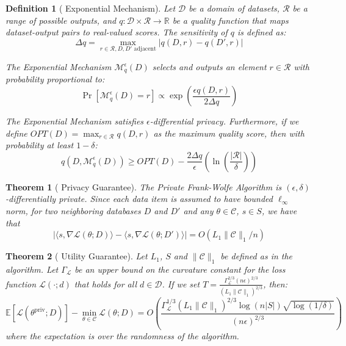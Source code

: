 \documentclass[12pt,letterpaper]{article}
\newtheorem{theorem}{Theorem}[section]
\newtheorem{definition}{Definition}
\begin{document}
\begin{definition}[\cite{ExpMech} Exponential Mechanism]
    \label{def:ExpMech}
    Let $\mathcal{D}$ be a domain of datasets, $\mathcal{R}$ be a range of possible outputs, and $q: \mathcal{D} \times \mathcal{R} \rightarrow \mathbb{R}$ be a quality function that maps dataset-output pairs to real-valued scores. The sensitivity of $q$ is defined as:
    \[
    \Delta q = \max_{r \in \mathcal{R}, D, D' \text{ adjacent}} |q(D,r) - q(D',r)|
    \]
    
    The Exponential Mechanism $\mathcal{M}_q^{\epsilon}(D)$ selects and outputs an element $r \in \mathcal{R}$ with probability proportional to:
    \[
    \Pr[\mathcal{M}_q^{\epsilon}(D) = r] \propto \exp\left(\frac{\epsilon q(D,r)}{2\Delta q}\right)
    \]
    
    The Exponential Mechanism satisfies $\epsilon$-differential privacy. Furthermore, if we define $OPT(D) = \max_{r \in \mathcal{R}} q(D,r)$ as the maximum quality score, then with probability at least $1-\delta$:
    \[
    q(D, \mathcal{M}_q^{\epsilon}(D)) \geq OPT(D) - \frac{2\Delta q}{\epsilon}\left(\ln\left(\frac{|\mathcal{R}|}{\delta}\right)\right)
    \]
\end{definition}

\begin{theorem}[\cite{NIPS2015_52d080a3} Privacy Guarantee]
    \label{thm:dp}
    The Private Frank-Wolfe Algorithm is $(\epsilon, \delta)$-differentially private.
    Since each data item is assumed to have bounded $\ell_{\infty}$ norm, for two neighboring databases $D$ and $D'$ and any $\theta \in \mathcal{C}$, $s \in S$, we have that
    \[
    |\langle s, \nabla \mathcal{L}(\theta; D) \rangle - \langle s, \nabla \mathcal{L}(\theta; D') \rangle| = O(L_1 \|\mathcal{C}\|_1/n)
    \]
\end{theorem}

\begin{theorem}[\cite{NIPS2015_52d080a3} Utility Guarantee]
    \label{thm:util}
    Let $L_1$, $S$ and $\|\mathcal{C}\|_1$ be defined as in the algorithm. Let $\Gamma_{\mathcal{L}}$ be an upper bound on the curvature constant for the loss function $\mathcal{L}(\cdot; d)$ that holds for all $d \in \mathcal{D}$. If we set $T = \frac{\Gamma_{\mathcal{L}}^{2/3}(n\epsilon)^{2/3}}{(L_1\|\mathcal{C}\|_1)^{2/3}}$, then:
    \[
    \mathbb{E}[\mathcal{L}(\theta^{\text{priv}}; D)] - \min_{\theta \in \mathcal{C}}\mathcal{L}(\theta; D) = O\left(\frac{\Gamma_{\mathcal{L}}^{1/3}(L_1\|\mathcal{C}\|_1)^{2/3}\log(n|S|)\sqrt{\log(1/\delta)}}{(n\epsilon)^{2/3}}\right)
    \]
    where the expectation is over the randomness of the algorithm.
\end{theorem}
\end{document}
